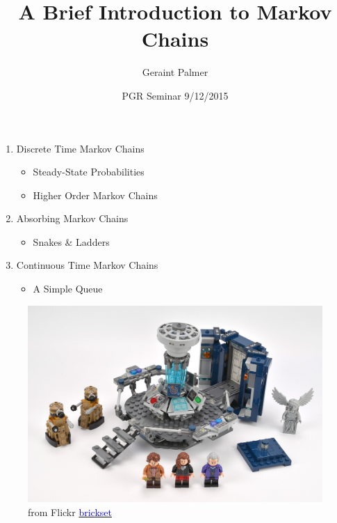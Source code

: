 \documentclass{beamer}
\title
{A Brief Introduction to Markov Chains}
\author{Geraint Palmer}
\date{PGR Seminar 9/12/2015}
\begin{document}
\frame{\titlepage}

\begin{frame}
  \begin{enumerate}
    \vfill\item Discrete Time Markov Chains
    \begin{itemize}
      \vfill\item Steady-State Probabilities
      \vfill\item Higher Order Markov Chains
    \end{itemize}
    \vfill\item Absorbing Markov Chains
    \begin{itemize}
      \vfill\item Snakes \& Ladders
    \end{itemize}
    \vfill\item Continuous Time Markov Chains
    \begin{itemize}
      \vfill\item A Simple Queue
    \end{itemize}
  \end{enumerate}
\end{frame}



\begin{frame}
\begin{figure}
  \includegraphics[width=\textwidth]{lego_drwho}
  \caption{from Flickr \href{https://www.flickr.com/photos/brickset/}{\textcolor{blue}{brickset}}}
\end{figure}
\end{frame}
\end{document}
